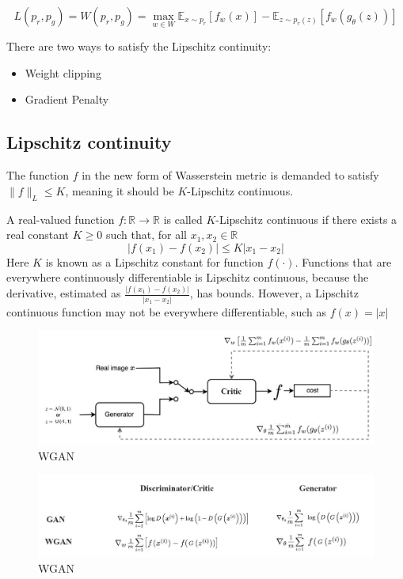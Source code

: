 $$L(p_r, p_g) = W(p_r, p_g) = \max_{w \in W} \mathbb{E}_{x \sim p_r}[f_w(x)] - \mathbb{E}_{z \sim p_r(z)}[f_w(g_\theta(z))]$$

There are two ways to satisfy the Lipschitz continuity:
\begin{itemize}
	\item Weight clipping
	\item Gradient Penalty
\end{itemize}

\subsection{Lipschitz continuity}
The function $f$ in the new form of Wasserstein metric is demanded to satisfy $\| f \|_L \leq K$, meaning it should be $K$-Lipschitz continuous. \citep{Lil2017}

A real-valued function $f: \mathbb{R} \rightarrow \mathbb{R}$ is called $K$-Lipschitz continuous if there exists a real constant $K\geq 0$ such that, for all $x_1, x_2 \in \mathbb{R}$
$$\lvert f(x_1) - f(x_2) \rvert \leq K \lvert x_1 - x_2 \rvert$$
Here $K$ is known as a Lipschitz constant for function $f(\cdot)$. Functions that are everywhere continuously differentiable is Lipschitz continuous, because the derivative, estimated as $\frac{\lvert f(x_1) - f(x_2) \rvert}{\lvert x_1 - x_2 \rvert}$, has bounds. However, a Lipschitz continuous function may not be everywhere differentiable, such as $f(x) = \lvert x \rvert$

\begin{figure}[h]
	\begin{center}
		\includegraphics[scale=0.25]{./images/generative/gan/wgan.jpeg}
	\end{center}
	\caption{WGAN}
	\label{fig:wgan}
\end{figure}

\begin{figure}[h]
	\begin{center}
		\includegraphics[scale=0.2]{./images/generative/gan/wgan_2.jpeg}
	\end{center}
	\caption{WGAN}
\end{figure}
